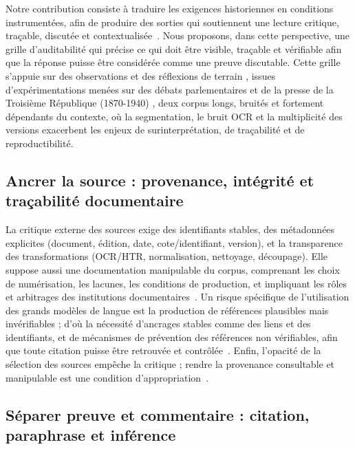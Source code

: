 \documentclass[final, fra]{anthology-ch}     %
\begin{document}
Notre contribution consiste à traduire les exigences historiennes en conditions instrumentées, afin de produire des sorties qui soutiennent une lecture critique, traçable, discutée et contextualisée~\cite{dobson2021interpretableoutputs, paakkonen2021humanisticinterpretation}. 
Nous proposons, dans cette perspective, une grille d’auditabilité qui précise ce qui doit être visible, traçable et vérifiable afin que la réponse puisse être considérée comme une preuve discutable. 
Cette grille s’appuie sur des observations et des réflexions \og de terrain \fg{}, issues d’expérimentations menées sur des débats parlementaires et de la presse de la Troisième République (1870-1940) \cite{pellet2025eval, pellet2024generative, bian-etal-2026-efficiently-explore, pellet2026historiqaThirdRepublic}, deux corpus longs, bruités et fortement dépendants du contexte, où la segmentation, le bruit OCR et la multiplicité des versions exacerbent les enjeux de surinterprétation, de traçabilité et de reproductibilité.

\subsection{Ancrer la source : provenance, intégrité et traçabilité documentaire}

La critique externe des sources exige des identifiants stables, des métadonnées explicites (document, édition, date, cote/identifiant, version), et la transparence des transformations (OCR/HTR, normalisation, nettoyage, découpage). Elle suppose aussi une documentation manipulable du corpus, comprenant les choix de numérisation, les lacunes, les conditions de production, et impliquant les rôles et arbitrages des institutions documentaires~\cite{lamasse_rygiel_2014_nouvellesFrontieres}. 
Un risque spécifique de l'utilisation des grands modèles de langue est la production de références plausibles mais invérifiables ; d’où la nécessité d’ancrages stables comme des liens et des identifiants, et de mécanismes de prévention des références non vérifiables, afin que toute citation puisse être retrouvée et contrôlée~\cite{byun2024citationaccuracy}. 
Enfin, l’opacité de la sélection des sources empêche la critique ; rendre la provenance consultable et manipulable est une condition d’appropriation~\cite{vonreeken2025untrusting}.

\subsection{Séparer preuve et commentaire : citation, paraphrase et inférence}
\end{document}
